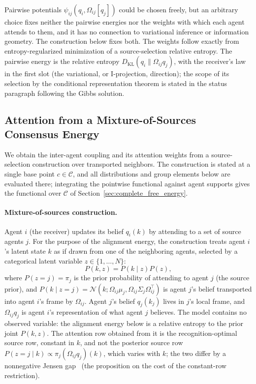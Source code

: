 Pairwise potentials $\psi_{ij}(q_i, \Omega_{ij}[q_j])$ could be chosen freely, but an arbitrary choice fixes neither the pairwise energies nor the weights with which each agent attends to them, and it has no connection to variational inference or information geometry. The construction below fixes both. The weights follow exactly from entropy-regularized minimization of a source-selection relative entropy. The pairwise energy is the relative entropy $D_{\mathrm{KL}}(q_i\|\Omega_{ij}q_j)$, with the receiver's law in the first slot (the variational, or I-projection, direction); the scope of its selection by the conditional representation theorem is stated in the status paragraph following the Gibbs solution.

\subsection{Attention from a Mixture-of-Sources Consensus Energy}
\label{sec:mixture_derivation}

We obtain the inter-agent coupling and its attention weights from a source-selection construction over transported neighbors. The construction is stated at a single base point $c \in \mathcal{C}$, and all distributions and group elements below are evaluated there; integrating the pointwise functional against agent supports gives the functional over $\mathcal{C}$ of Section~\ref{sec:complete_free_energy}.

\paragraph{Mixture-of-sources construction.}
Agent $i$ (the receiver) updates its belief $q_i(k)$ by attending to a set of source agents $j$. For the purpose of the alignment energy, the construction treats agent $i$'s latent state $k$ as if drawn from one of the neighboring agents, selected by a categorical latent variable $z \in \{1, \ldots, N\}$:
\begin{equation}
P(k, z) = P(k \mid z) P(z),
\label{eq:mixture_joint}
\end{equation}
where $P(z = j) = \pi_j$ is the prior probability of attending to agent $j$ (the source prior), and $P(k \mid z = j) = \mathcal{N}(k; \Omega_{ij}\mu_j, \Omega_{ij}\Sigma_j\Omega_{ij}^\top)$ is agent $j$'s belief transported into agent $i$'s frame by $\Omega_{ij}$. Agent $j$'s belief $q_j(k_j)$ lives in $j$'s local frame, and $\Omega_{ij}q_j$ is agent $i$'s representation of what agent $j$ believes. The model contains no observed variable: the alignment energy below is a relative entropy to the prior joint $P(k,z)$. The attention row obtained from it is the recognition-optimal source row, constant in $k$, and not the posterior source row $P(z = j \mid k) \propto \pi_j (\Omega_{ij}q_j)(k)$, which varies with $k$; the two differ by a nonnegative Jensen gap~\cite[Ch.~6]{DennisGaugeVFE2026} (the proposition on the cost of the constant-row restriction).

